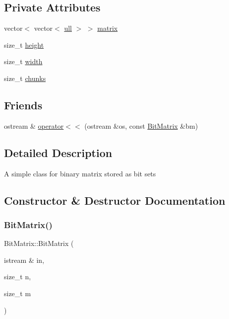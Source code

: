 \subsection*{Private Attributes}
\begin{DoxyCompactItemize}
\item 
vector$<$ vector$<$ \hyperlink{main_8cpp_a49d1cb44c18ad3e6cc52845f905e6181}{ull} $>$ $>$ \hyperlink{classBitMatrix_abe5132a2524a8c5d5e5a11d0f4753bc6}{matrix}
\item 
size\+\_\+t \hyperlink{classBitMatrix_a546978092da7a641ac9c23daa88a31ae}{height}
\item 
size\+\_\+t \hyperlink{classBitMatrix_a8f75a335960dd7af6fc791f43bc3a8c1}{width}
\item 
size\+\_\+t \hyperlink{classBitMatrix_af4a0d4517ff5a485c5787150f9e6a545}{chunks}
\end{DoxyCompactItemize}
\subsection*{Friends}
\begin{DoxyCompactItemize}
\item 
ostream \& \hyperlink{classBitMatrix_aa35d89b587731633f4de5309b083689b}{operator$<$$<$} (ostream \&os, const \hyperlink{classBitMatrix}{Bit\+Matrix} \&bm)
\end{DoxyCompactItemize}


\subsection{Detailed Description}
A simple class for binary matrix stored as bit sets 

\subsection{Constructor \& Destructor Documentation}
\mbox{\label{classBitMatrix_aea3afaf70111c302f23971bbb84dee10}} 
\subsubsection{\texorpdfstring{Bit\+Matrix()}{BitMatrix()}\hspace{0.1cm}{\footnotesize\ttfamily [1/2]}}
{\footnotesize\ttfamily Bit\+Matrix\+::\+Bit\+Matrix (\begin{DoxyParamCaption}\item[{istream \&}]{in,  }\item[{size\+\_\+t}]{n,  }\item[{size\+\_\+t}]{m }\end{DoxyParamCaption})\hspace{0.3cm}{\ttfamily [inline]}}

